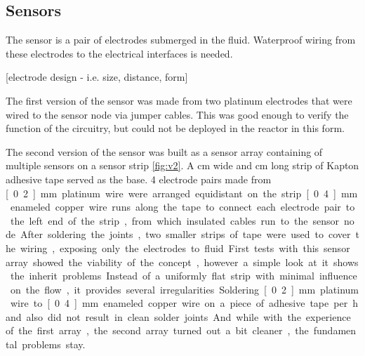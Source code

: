 \subsection{Sensors}

The sensor is a pair of electrodes submerged in the fluid. Waterproof wiring from these electrodes to the electrical interfaces is needed.

[electrode design - i.e. size, distance, form]

The first version of the sensor was made from two platinum electrodes that were wired to the sensor node via jumper cables. This was good enough to verify the function of the circuitry, but could not be deployed in the reactor in this form.

The second version of the sensor was built as a sensor array containing of multiple sensors on a sensor strip \ref{fig:v2}. A \unit[5]{cm} wide and \unit[25]{cm} long strip of Kapton adhesive tape served as the base. 4 electrode pairs made from \unit[0.2]{mm} platinum wire were arranged equidistant on the strip. \unit[0.4]{mm} enameled copper wire runs along the tape to connect each electrode pair to the left end of the strip, from which insulated cables run to the sensor node. After soldering the joints, two smaller strips of tape were used to cover the wiring, exposing only the electrodes to fluid.

First tests with this sensor array showed the viability of the concept, however a simple look at it shows the inherit problems. Instead of a uniformly flat strip with minimal influence on the flow, it provides several irregularities. Soldering \unit[0.2]{mm} platinum wire to \unit[0.4]{mm} enameled copper wire on a piece of adhesive tape per hand also did not result in clean solder joints. And while with the experience of the first array, the second array turned out a bit cleaner, the fundamental problems stay.

